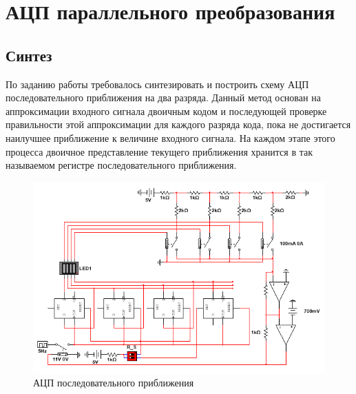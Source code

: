 \section*{АЦП параллельного преобразования}
\subsection*{Синтез}

По заданию работы требовалось синтезировать и построить схему АЦП
последовательного приближения на два разряда. Данный метод основан на аппроксимации
входного сигнала двоичным кодом и последующей проверке правильности этой
аппроксимации для каждого разряда кода, пока не достигается наилучшее приближение к
величине входного сигнала. На каждом этапе этого процесса двоичное представление
текущего приближения хранится в так называемом регистре последовательного
приближения.

\begin{figure}[h!]
    \centering
    \includegraphics[scale=0.8]{images/image-6.png}
    \caption{АЦП последовательного приближения}
\end{figure}